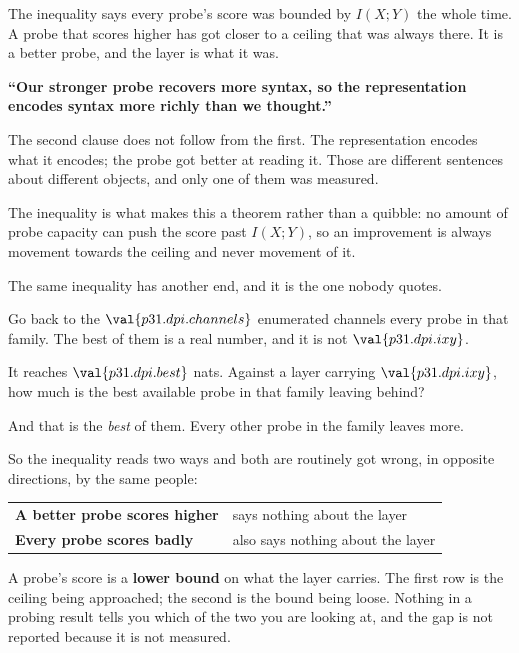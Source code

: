 \begin{fr}

The inequality says every probe's score was bounded by $I(X; Y)$ the whole
time. A probe that scores higher has got closer to a ceiling that was always
there. It is a better probe, and the layer is what it was.

\begin{trapbox}
\textbf{\enquote{Our stronger probe recovers more syntax, so the
representation encodes syntax more richly than we thought.}}

The second clause does not follow from the first. The representation encodes
what it encodes; the probe got better at reading it. Those are different
sentences about different objects, and only one of them was measured.

The inequality is what makes this a theorem rather than a quibble: no amount
of probe capacity can push the score past $I(X; Y)$, so an improvement is
always movement towards the ceiling and never movement of it.
\end{trapbox}
\end{fr}

\begin{fr}
The same inequality has another end, and it is the one nobody quotes.

Go back to the $\val{p31.dpi.channels}$ enumerated channels \dash{} every
probe in that family. The best of them is a real number, and it is not
$\val{p31.dpi.ixy}$.

It reaches $\val{p31.dpi.best}$ nats. Against a layer carrying
$\val{p31.dpi.ixy}$, how much is the best available probe in that family
leaving behind?
\dotline
\nextframe
\end{fr}

\begin{fr}

And that is the \emph{best} of them. Every other probe in the family leaves
more.

So the inequality reads two ways and both are routinely got wrong, in
opposite directions, by the same people:

\begin{center}
\begin{tabular}{ll}
\toprule
\textbf{A better probe scores higher} & says nothing about the layer \\
\textbf{Every probe scores badly} & also says nothing about the layer \\
\bottomrule
\end{tabular}
\end{center}

A probe's score is a \textbf{lower bound} on what the layer carries. The
first row is the ceiling being approached; the second is the bound being
loose. Nothing in a probing result tells you which of the two you are looking
at, and the gap is not reported because it is not measured.
\end{fr}

